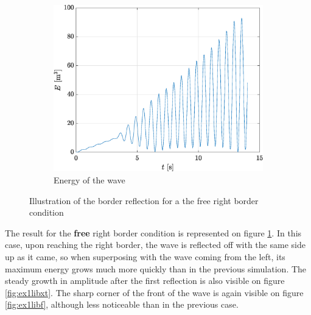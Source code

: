 \documentclass[a4paper,12pt,twoside]{article}
\begin{document}
\begin{figure}[h!]
    \centering
    \begin{subfigure}{0.5\textwidth}
    \includegraphics[width=\textwidth]{graphs/ex1Elibre.eps}
    \caption{Energy of the wave}
    \end{subfigure}

    \caption{Illustration of the border reflection for a the free right border condition}
    \label{fig:ex1lib}
    \end{figure}

    The result for the \textbf{free} right border condition is represented on figure \ref{fig:ex1lib}. In this case, upon reaching the right border, the wave is reflected off with the same side up as it came, so when superposing with the wave coming from the left, its maximum energy grows much more quickly than in the previous simulation. The steady growth in amplitude after the first reflection is also visible on figure \ref{fig:ex1libxt}. The sharp corner of the front of the wave is again visible on figure \ref{fig:ex1libf}, although less noticeable than in the previous case.
\end{document}
